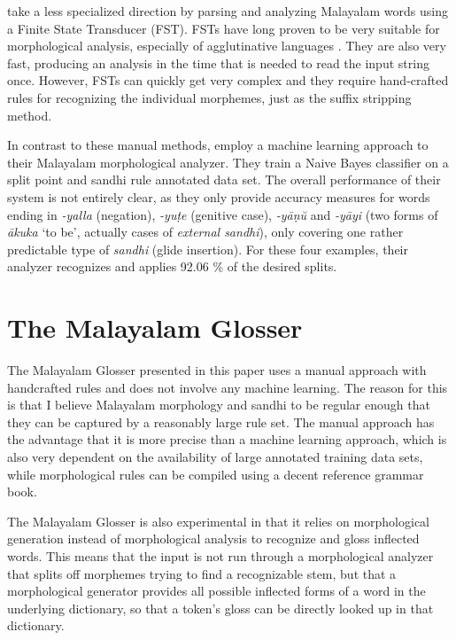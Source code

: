 \documentclass[a4paper]{article}
\begin{document}
\textcite{manju2009pos} take a less specialized direction by parsing and analyzing Malayalam words using a Finite State Transducer (FST). FSTs have long proven to be very suitable for morphological analysis, especially of agglutinative languages \parencite{fsm}. They are also very fast, producing an analysis in the time that is needed to read the input string once. However, FSTs can quickly get very complex and they require hand-crafted rules for recognizing the individual morphemes, just as the suffix stripping method.

In contrast to these manual methods, \textcite{sebastian2018morph} employ a machine learning approach to their Malayalam morphological analyzer. They train a Naive Bayes classifier on a split point and sandhi rule annotated data set. The overall performance of their system is not entirely clear, as they only provide accuracy measures for words ending in \textit{-yalla} (negation), \textit{-yuṭe} (genitive case), \textit{-yāṇŭ} and \textit{-yāyi} (two forms of \textit{ākuka} `to be', actually cases of \textit{external sandhi}), only covering one rather predictable type of \textit{sandhi} (glide insertion). For these four examples, their analyzer recognizes and applies 92.06 \% of the desired splits.


\section{The Malayalam Glosser}\label{sec:glosser}

The Malayalam Glosser presented in this paper uses a manual approach with handcrafted rules and does not involve any machine learning. The reason for this is that I believe Malayalam morphology and sandhi to be regular enough that they can be captured by a reasonably large rule set. The manual approach has the advantage that it is more precise than a machine learning approach, which is also very dependent on the availability of large annotated training data sets, while morphological rules can be compiled using a decent reference grammar book.

The Malayalam Glosser is also experimental in that it relies on morphological generation instead of morphological analysis to recognize and gloss inflected words. This means that the input is not run through a morphological analyzer that splits off morphemes trying to find a recognizable stem, but that a morphological generator provides all possible inflected forms of a word in the underlying dictionary, so that a token's gloss can be directly looked up in that dictionary.
\end{document}
